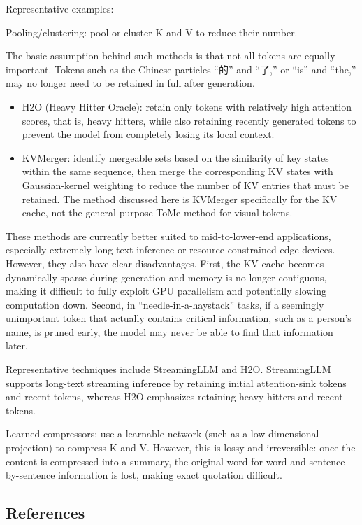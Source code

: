 Representative examples:

Pooling/clustering: pool or cluster K and V to reduce their number.

The basic assumption behind such methods is that not all tokens are equally important. Tokens such as the Chinese particles ``的'' and ``了,'' or ``is'' and ``the,'' may no longer need to be retained in full after generation.

\begin{itemize}
\tightlist
\item
  H2O (Heavy Hitter Oracle): retain only tokens with relatively high attention scores, that is, heavy hitters, while also retaining recently generated tokens to prevent the model from completely losing its local context.
\item
  KVMerger: identify mergeable sets based on the similarity of key states within the same sequence, then merge the corresponding KV states with Gaussian-kernel weighting to reduce the number of KV entries that must be retained. The method discussed here is KVMerger specifically for the KV cache, not the general-purpose ToMe method for visual tokens.
\end{itemize}

These methods are currently better suited to mid-to-lower-end applications, especially extremely long-text inference or resource-constrained edge devices. However, they also have clear disadvantages. First, the KV cache becomes dynamically sparse during generation and memory is no longer contiguous, making it difficult to fully exploit GPU parallelism and potentially slowing computation down. Second, in ``needle-in-a-haystack'' tasks, if a seemingly unimportant token that actually contains critical information, such as a person's name, is pruned early, the model may never be able to find that information later.

Representative techniques include StreamingLLM and H2O. StreamingLLM supports long-text streaming inference by retaining initial attention-sink tokens and recent tokens, whereas H2O emphasizes retaining heavy hitters and recent tokens.

Learned compressors: use a learnable network (such as a low-dimensional projection) to compress K and V. However, this is lossy and irreversible: once the content is compressed into a summary, the original word-for-word and sentence-by-sentence information is lost, making exact quotation difficult.

\FloatBarrier
{}
\hypertarget{references-96}{%
\subsection{References}\label{references-96}}

